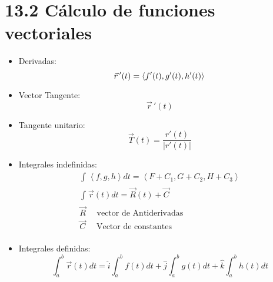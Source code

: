 % 
% 

\section{13.2 Cálculo de funciones vectoriales}
\begin{itemize}
    \item Derivadas:
        \[
            \vec{r}\,'(t)=\left\langle f'(t),g'(t),h'(t) \right\rangle \\ 
        \]
    
    \item Vector Tangente:
        \[
          \vec{r}\, ' (t) 
        \]
    
    \item Tangente unitario:
        \[
          \vec{T}(t)=\frac{r'(t)}{\left| r'(t) \right| } 
        \]
    
    \item Integrales indefinidas:
        \begin{align*}
          \int_{}^{}\left\langle f,g,h \right\rangle dt = \left\langle F+C_1,G+C_2,H+C_3 \right\rangle \\
          \int_{}^{}\vec{r}(t) dt  = \vec{R}(t) + \vec{C} \\
          \vec{R} \quad \text{ vector de Antiderivadas  } \\ 
          \vec{C} \quad \text{  Vector de constantes  } \\   
        \end{align*}
    
    \item Integrales definidas:
        \[
          \int_{a}^{b}\vec{r}(t)dt = \hat{i} \int_{a}^{b}f(t)dt+ \hat{j} \int_{a}^{b}g(t)dt + \hat{k} \int_{a}^{b}h(t)dt
        \]
\end{itemize}


